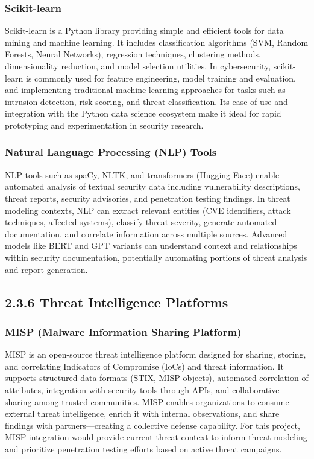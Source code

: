 \documentclass[12pt,a4paper]{report}
\begin{document}
\subsubsection{Scikit-learn}

Scikit-learn is a Python library providing simple and efficient tools for data mining and machine learning. It includes classification algorithms (SVM, Random Forests, Neural Networks), regression techniques, clustering methods, dimensionality reduction, and model selection utilities. In cybersecurity, scikit-learn is commonly used for feature engineering, model training and evaluation, and implementing traditional machine learning approaches for tasks such as intrusion detection, risk scoring, and threat classification. Its ease of use and integration with the Python data science ecosystem make it ideal for rapid prototyping and experimentation in security research.

\subsubsection{Natural Language Processing (NLP) Tools}

NLP tools such as spaCy, NLTK, and transformers (Hugging Face) enable automated analysis of textual security data including vulnerability descriptions, threat reports, security advisories, and penetration testing findings. In threat modeling contexts, NLP can extract relevant entities (CVE identifiers, attack techniques, affected systems), classify threat severity, generate automated documentation, and correlate information across multiple sources. Advanced models like BERT and GPT variants can understand context and relationships within security documentation, potentially automating portions of threat analysis and report generation.

\subsection{2.3.6 Threat Intelligence Platforms}

\subsubsection{MISP (Malware Information Sharing Platform)}

MISP is an open-source threat intelligence platform designed for sharing, storing, and correlating Indicators of Compromise (IoCs) and threat information. It supports structured data formats (STIX, MISP objects), automated correlation of attributes, integration with security tools through APIs, and collaborative sharing among trusted communities. MISP enables organizations to consume external threat intelligence, enrich it with internal observations, and share findings with partners—creating a collective defense capability. For this project, MISP integration would provide current threat context to inform threat modeling and prioritize penetration testing efforts based on active threat campaigns.
\end{document}
